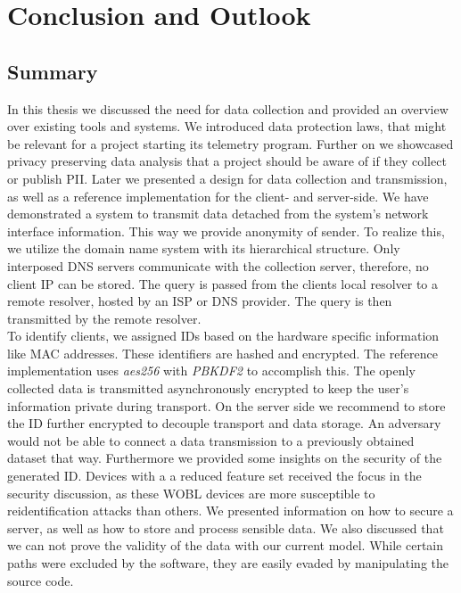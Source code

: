 \chapter{Conclusion and Outlook}
\label{chap:conclusion}
\section{Summary}
In this thesis we discussed the need for data collection and provided an overview over existing tools and systems. We introduced data protection laws, that might be relevant for a project starting its telemetry program. Further on we showcased privacy preserving data analysis that a project should be aware of if they collect or publish PII. 
Later we presented a design for data collection and transmission, as well as a reference implementation for the client- and server-side. We have demonstrated a system to transmit data
detached from the system's network interface information. This way we provide anonymity of sender. 
To realize this, we utilize the domain name system with its hierarchical structure. Only interposed DNS servers communicate with the collection server, therefore, no client IP can be stored. The query is passed from the clients local resolver to a remote resolver, hosted by an ISP or DNS provider. The query is then transmitted by the remote resolver.\\
To identify clients, we assigned IDs based on the hardware specific information like MAC addresses. These identifiers are hashed and encrypted. The reference implementation uses \textit{aes256} with \textit{PBKDF2} to accomplish this. The openly collected data is transmitted asynchronously encrypted to keep the user's information private during transport.
On the server side we recommend to store the ID further encrypted to decouple transport and data storage. An adversary would not be able to connect a data transmission to a previously obtained dataset that way. Furthermore we provided some insights on the security of the generated ID. Devices with a a reduced feature set received the focus in the security discussion, as these WOBL devices are more 
susceptible to reidentification attacks than others.
We presented information on how to secure a server, as well as how to store and process sensible data.
We also discussed that we can not prove the validity of the data with our current model. While certain paths were excluded by the software, they are easily evaded by manipulating the source code.


